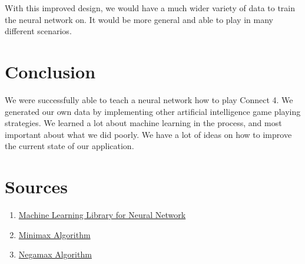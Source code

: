 \documentclass[12pt]{article}
\begin{document}
With this improved  design, we would have a much wider variety of data to train the neural network on. It would be more general and able to play in many different scenarios.

\section{Conclusion}
We were successfully able to teach a neural network how to play Connect 4. We generated our own data by implementing other artificial intelligence game playing strategies. We learned a lot about machine learning in the process, and most important about what we did poorly. We have a lot of ideas on how to improve the current state of our application. 

\pagebreak
\section{Sources}
\singlespacing
\begin{enumerate}
	\item\href{http://scikit-learn.org/stable/}{Machine Learning Library for Neural Network}
	\item\href{https://github.com/erikackermann/Connect-Four}{Minimax Algorithm}
	\item\href{http://blog.gamesolver.org/}{Negamax Algorithm}
\end{enumerate}
\end{document}
